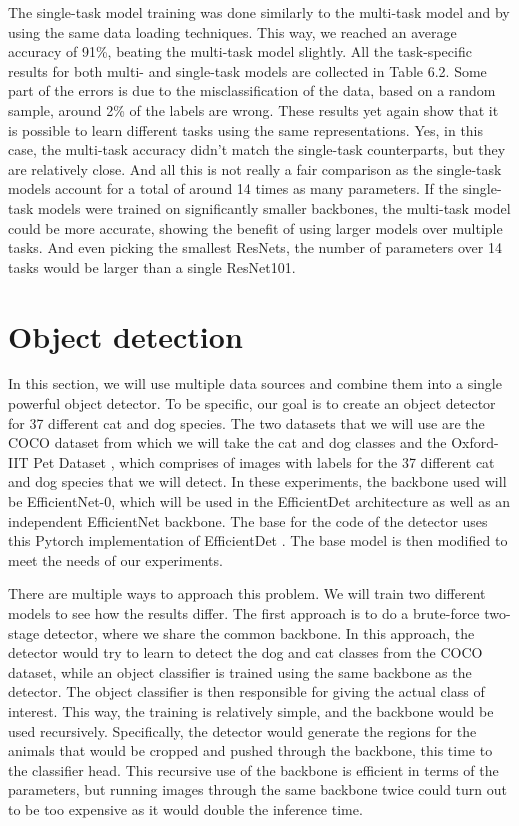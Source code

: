 The single-task model training was done similarly to the multi-task model and by using the same data loading techniques.
This way, we reached an average accuracy of 91\%, beating the multi-task model slightly.
All the task-specific results for both multi- and single-task models are collected in Table 6.2.
Some part of the errors is due to the misclassification of the data, based on a random sample, around 2\% of the labels are wrong.
These results yet again show that it is possible to learn different tasks using the same representations.
Yes, in this case, the multi-task accuracy didn't match the single-task counterparts, but they are relatively close.
And all this is not really a fair comparison as the single-task models account for a total of around 14 times as many parameters.
If the single-task models were trained on significantly smaller backbones, the multi-task model could be more accurate, showing the benefit of using larger models over multiple tasks.
And even picking the smallest ResNets, the number of parameters over 14 tasks would be larger than a single ResNet101.

\section{Object detection}
In this section, we will use multiple data sources and combine them into a single powerful object detector.
To be specific, our goal is to create an object detector for 37 different cat and dog species.
The two datasets that we will use are the COCO dataset \citep{COCO} from which we will take the cat and dog classes and the Oxford-IIT Pet Dataset \citep{catsdogs}, which comprises of images with labels for the 37 different cat and dog species that we will detect.
In these experiments, the backbone used will be EfficientNet-0, which will be used in the EfficientDet architecture as well as an independent EfficientNet backbone.
The base for the code of the detector uses this Pytorch implementation of EfficientDet \citep{pytorch-efficientdet}.
The base model is then modified to meet the needs of our experiments.

There are multiple ways to approach this problem.
We will train two different models to see how the results differ.
The first approach is to do a brute-force two-stage detector, where we share the common backbone.
In this approach, the detector would try to learn to detect the dog and cat classes from the COCO dataset, while an object classifier is trained using the same backbone as the detector.
The object classifier is then responsible for giving the actual class of interest.
This way, the training is relatively simple, and the backbone would be used recursively.
Specifically, the detector would generate the regions for the animals that would be cropped and pushed through the backbone, this time to the classifier head.
This recursive use of the backbone is efficient in terms of the parameters, but running images through the same backbone twice could turn out to be too expensive as it would double the inference time.

